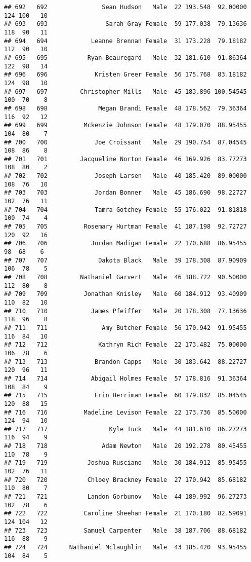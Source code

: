 \documentclass[
]{article}
\begin{document}
\begin{verbatim}
## 692   692               Sean Hudson   Male  22 193.548  92.00000 124 100   10
## 693   693                Sarah Gray Female  59 177.038  79.13636 118  90   11
## 694   694            Leanne Brennan Female  31 173.228  79.18182 112  90   10
## 695   695           Ryan Beauregard   Male  32 181.610  91.86364 122  98   14
## 696   696             Kristen Greer Female  56 175.768  83.18182 124  98   10
## 697   697         Christopher Mills   Male  45 183.896 100.54545 100  70    8
## 698   698              Megan Brandi Female  48 178.562  79.36364 116  92   12
## 699   699          Mckenzie Johnson Female  48 179.070  88.95455 104  80    7
## 700   700             Joe Croissant   Male  29 190.754  87.04545 108  86    8
## 701   701         Jacqueline Norton Female  46 169.926  83.77273 108  80    2
## 702   702             Joseph Larsen   Male  40 185.420  89.00000 108  76   10
## 703   703             Jordan Bonner   Male  45 186.690  98.22727 102  76   11
## 704   704             Tamra Gotchey Female  55 176.022  91.81818 100  74    4
## 705   705          Rosemary Hurtman Female  41 187.198  92.72727 120  92   16
## 706   706            Jordan Madigan Female  22 170.688  86.95455  98  68    6
## 707   707              Dakota Black   Male  39 178.308  87.90909 106  78    5
## 708   708         Nathaniel Garvert   Male  46 188.722  90.50000 112  80    8
## 709   709          Jonathan Knisley   Male  60 184.912  93.40909 110  82   10
## 710   710            James Pfeiffer   Male  20 178.308  77.13636 118  96    8
## 711   711               Amy Butcher Female  56 170.942  91.95455 116  84   10
## 712   712              Kathryn Rich Female  22 173.482  75.00000 106  78    6
## 713   713             Brandon Capps   Male  30 183.642  88.22727 120  96   11
## 714   714            Abigail Holmes Female  57 178.816  91.36364 108  84    9
## 715   715             Erin Herriman Female  60 179.832  85.04545 120  88   15
## 716   716          Madeline Levison Female  22 173.736  85.50000 124  94   10
## 717   717                 Kyle Tuck   Male  44 181.610  86.27273 116  94    9
## 718   718               Adam Newton   Male  20 192.278  80.45455 110  78    9
## 719   719           Joshua Rusciano   Male  30 184.912  85.95455 102  76   11
## 720   720           Chloey Brackney Female  27 170.942  85.68182 110  80    7
## 721   721           Landon Gorbunov   Male  44 189.992  96.27273 102  78    6
## 722   722          Caroline Sheehan Female  21 170.180  82.59091 124 104   12
## 723   723          Samuel Carpenter   Male  38 187.706  88.68182 116  88    9
## 724   724      Nathaniel Mclaughlin   Male  43 185.420  93.95455 104  84    5

\end{verbatim}
\end{document}
